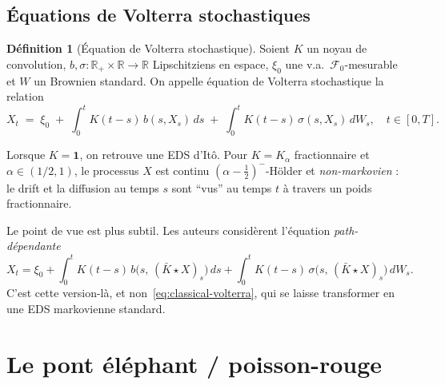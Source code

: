 \documentclass[11pt,a4paper]{article}
\theoremstyle{definition}
\newtheorem{definition}[theorem]{Définition}
\newcommand{\R}{\mathbb{R}}
\newcommand{\1}{\mathbf{1}}
\newcommand{\F}{\mathcal{F}}
\begin{document}
\subsection{Équations de Volterra stochastiques}

\begin{definition}[Équation de Volterra stochastique]
Soient $K$ un noyau de convolution, $b,\sigma:\R_+\times\R\to\R$ Lipschitziens
en espace, $\xi_0$ une v.a.\ $\F_0$-mesurable et $W$ un Brownien standard. On
appelle équation de Volterra stochastique la relation
\begin{equation}
X_t \;=\; \xi_0 \;+\; \int_0^t K(t-s)\, b(s,X_s)\, ds \;+\; \int_0^t K(t-s)\, \sigma(s,X_s)\, dW_s,
\quad t\in[0,T].
\label{eq:classical-volterra}
\end{equation}
\end{definition}

Lorsque $K=\1$, on retrouve une EDS d'Itô. Pour $K=K_\alpha$ fractionnaire et
$\alpha\in(1/2,1)$, le processus $X$ est continu $(\alpha-\tfrac{1}{2})^{-}$-Hölder
et \emph{non-markovien} : le drift et la diffusion au temps $s$ sont \enquote{vus} au
temps $t$ à travers un poids fractionnaire.

\bigskip
Le point de vue \cite{BCGP23} est plus subtil. Les auteurs considèrent
l'équation \emph{path-dépendante}
\begin{equation}
X_t = \xi_0 + \int_0^t K(t-s)\,b\bigl(s,\,(\bar K\star X)_s\bigr)\,ds
       + \int_0^t K(t-s)\,\sigma\bigl(s,\,(\bar K\star X)_s\bigr)\,dW_s.
\label{eq:path-dep-volterra}
\end{equation}
C'est cette version-là, et non~\eqref{eq:classical-volterra}, qui se laisse
transformer en une EDS markovienne standard.

\section{Le pont éléphant / poisson-rouge}
\label{sec:BCGP}
\end{document}

